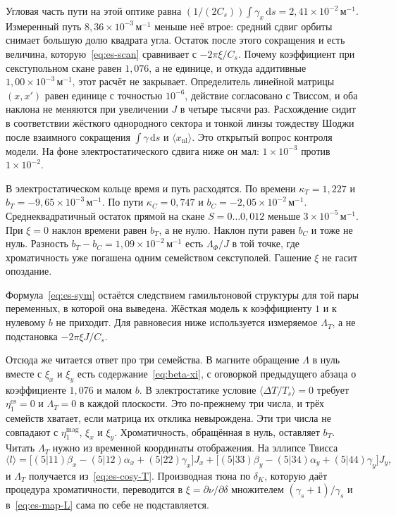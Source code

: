 Угловая часть пути на этой оптике равна $(1/(2C_s))\int\gamma_x\,\mathrm{d}s=2{,}41\times 10^{-2}\,\mathrm{м}^{-1}$. Измеренный путь $8{,}36\times 10^{-3}\,\mathrm{м}^{-1}$ меньше неё втрое: средний сдвиг орбиты снимает большую долю квадрата угла. Остаток после этого сокращения и есть величина, которую~\eqref{eq:es-scan} сравнивает с $-2\pi\xi/C_s$. Почему коэффициент при секступольном скане равен $1{,}076$, а не единице, и откуда аддитивные $1{,}00\times 10^{-3}\,\mathrm{м}^{-1}$, этот расчёт не закрывает. Определитель линейной матрицы $(x,x')$ равен единице с точностью $10^{-6}$, действие согласовано с Твиссом, и оба наклона не меняются при увеличении $J$ в четыре тысячи раз. Расхождение сидит в соответствии жёсткого однородного сектора и тонкой линзы тождеству Шоджи после взаимного сокращения $\int\gamma\,\mathrm{d}s$ и $\langle x_{\mathrm{nl}}\rangle$. Это открытый вопрос контроля модели. На фоне электростатического сдвига ниже он мал: $1\times 10^{-3}$ против $1\times 10^{-2}$.

В электростатическом кольце время и путь расходятся. По времени $\kappa_T=1{,}227$ и $b_T=-9{,}65\times 10^{-3}\,\mathrm{м}^{-1}$. По пути $\kappa_C=0{,}747$ и $b_C=-2{,}05\times 10^{-2}\,\mathrm{м}^{-1}$. Среднеквадратичный остаток прямой на скане $S=0\ldots 0{,}012$ меньше $3\times 10^{-5}\,\mathrm{м}^{-1}$. При $\xi=0$ наклон времени равен $b_T$, а не нулю. Наклон пути равен $b_C$ и тоже не нуль. Разность $b_T-b_C=1{,}09\times 10^{-2}\,\mathrm{м}^{-1}$ есть $\Lambda_\Phi/J$ в той точке, где хроматичность уже погашена одним семейством секступолей. Гашение $\xi$ не гасит опоздание.

Формула~\eqref{eq:es-sym} остаётся следствием гамильтоновой структуры для той пары переменных, в которой она выведена. Жёсткая модель к коэффициенту $1$ и к нулевому $b$ не приходит. Для равновесия ниже используется измеряемое $\Lambda_T$, а не подстановка $-2\pi\xi J/C_s$.

Отсюда же читается ответ про три семейства. В магните обращение $\Lambda$ в нуль вместе с $\xi_x$ и $\xi_y$ есть содержание~\eqref{eq:beta-xi}, с оговоркой предыдущего абзаца о коэффициенте $1{,}076$ и малом $b$. В электростатике условие $\langle\Delta T/T_s\rangle=0$ требует $\eta_1^{\mathrm{es}}=0$ и $\Lambda_T=0$ в каждой плоскости. Это по-прежнему три числа, и трёх семейств хватает, если матрица их отклика невырождена. Эти три числа не совпадают с $\eta_1^{\mathrm{mag}}$, $\xi_x$ и $\xi_y$. Хроматичность, обращённая в нуль, оставляет $b_T$. Читать $\Lambda_T$ нужно из временной координаты отображения. На эллипсе Твисса
\begin{equation}
\label{eq:es-map-L}
\langle l\rangle
=\bigl[(5|11)\beta_x-(5|12)\alpha_x+(5|22)\gamma_x\bigr]J_x
+\bigl[(5|33)\beta_y-(5|34)\alpha_y+(5|44)\gamma_y\bigr]J_y,
\end{equation}
и $\Lambda_T$ получается из~\eqref{eq:es-cosy-T}. Производная тюна по $\delta_K$, которую даёт процедура хроматичности, переводится в $\xi=\partial\nu/\partial\delta$ множителем $(\gamma_s+1)/\gamma_s$ и в~\eqref{eq:es-map-L} сама по себе не подставляется.

